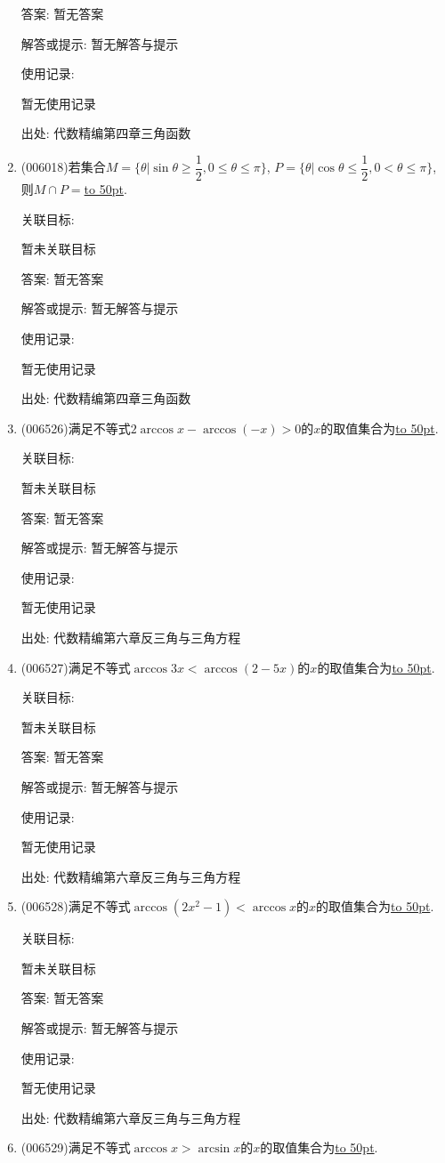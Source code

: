 \documentclass[10pt,a4paper]{article}
\newcommand{\blank}[1]{\underline{\hbox to #1pt{}}}
\begin{document}
\begin{enumerate}[1.]
答案: 暂无答案

解答或提示: 暂无解答与提示

使用记录:

暂无使用记录


出处: 代数精编第四章三角函数
\item { (006018)}若集合$M=\{\theta|\sin \theta \ge \dfrac 12,0\le \theta \le \pi\}$, $P=\{\theta|\cos \theta \le \dfrac 12,0<\theta \le \pi\}$, 则$M\cap P=$\blank{50}.


关联目标:

暂未关联目标

答案: 暂无答案

解答或提示: 暂无解答与提示

使用记录:

暂无使用记录


出处: 代数精编第四章三角函数
\item { (006526)}满足不等式$2\arccos x-\arccos (-x)>0$的$x$的取值集合为\blank{50}.


关联目标:

暂未关联目标

答案: 暂无答案

解答或提示: 暂无解答与提示

使用记录:

暂无使用记录


出处: 代数精编第六章反三角与三角方程
\item { (006527)}满足不等式$\arccos 3x<\arccos (2-5x)$的$x$的取值集合为\blank{50}.


关联目标:

暂未关联目标

答案: 暂无答案

解答或提示: 暂无解答与提示

使用记录:

暂无使用记录


出处: 代数精编第六章反三角与三角方程
\item { (006528)}满足不等式$\arccos (2x^2-1)<\arccos x$的$x$的取值集合为\blank{50}.


关联目标:

暂未关联目标

答案: 暂无答案

解答或提示: 暂无解答与提示

使用记录:

暂无使用记录


出处: 代数精编第六章反三角与三角方程
\item { (006529)}满足不等式$\arccos x>\arcsin x$的$x$的取值集合为\blank{50}.



\end{enumerate}
\end{document}

